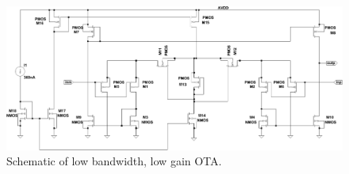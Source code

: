\documentclass[12pt,oneside,final]{siuethesis}
\theoremstyle{definition}
\begin{document}
\begin{figure}[htbp!]
	\centering
 	\includegraphics[scale=0.8,keepaspectratio=true, angle=90]{../Design_Reports/CFD_circuit_report/images/small_gm_ota.pdf}
 	\caption{Schematic of low bandwidth, low gain OTA.}
 	\label{fig:slowota}
\end{figure}
\end{document}
